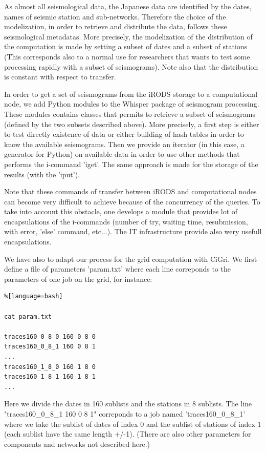 \documentclass[a4paper, 10pt]{article}
\begin{document}
\begin{multicols}{2}
As almost all seismological data, the Japanese data are identified by the dates, names of seismic station and sub-networks. Therefore
the choice of the modelization, in order to retrieve and distribute the data, follows these seismological metadatas.
More precisely, the modelization of the distribution of the computation is made by setting a subset of dates and a subset of stations 
(This corresponds also to a normal use for researchers that wants to test some processing rapidly with a subset of seismograms).
Note also that the distribution is constant with respect to transfer.


In order to get a set of seismograms from the iRODS storage  to a computational node, we add Python modules to the Whisper package of seismogram processing.
These modules contains classes that permits to retrieve a subset of seismograms (defined by the two subsets described above). More precisely, a first step is either to test directly existence of data or either building of hash tables in order to know the available seismograms.
Then we provide an iterator (in this case, a generator for Python) on available data in order to use other methods that performs the i-command
'iget'. The same approach is made for the storage of the results (with the 'iput').


Note that these commands of transfer between iRODS and computational nodes can become very difficult to achieve because of the concurrency of the queries.
To take into account this obstacle, one develops a module that provides lot of encapsulations of the i-commands (number of try, waiting time,
resubmission, with error, 'else' command,  etc...). The IT infrastructure provide also wery usefull encapsulations.


We have also to adapt our process for the grid computation with CiGri. We first define a file of parameters 'param.txt' where
each line correponds to the parameters of one job on the grid, for instance:

\begin{lstlisting}%[language=bash]

cat param.txt

traces160_0_8_0 160 0 8 0
traces160_0_8_1 160 0 8 1
...
traces160_1_8_0 160 1 8 0
traces160_1_8_1 160 1 8 1
...
\end{lstlisting}

Here we divide the dates in 160 sublists and the stations in 8 sublists. 
The line "traces160\_0\_8\_1 160 0 8 1" correponds to a job named 'traces160\_0\_8\_1' where
we take the sublist of dates of index 0 and the sublist of stations of index 1 (each sublist have the same length +/-1).
(There are also other parameters for components and networks not described here.) 



\end{multicols}
\end{document}
